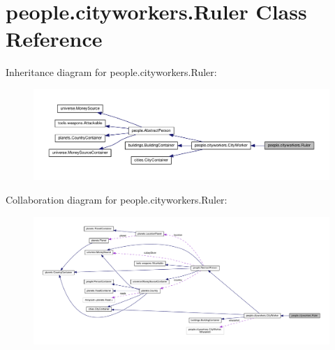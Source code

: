 \hypertarget{classpeople_1_1cityworkers_1_1_ruler}{}\section{people.\+cityworkers.\+Ruler Class Reference}
\label{classpeople_1_1cityworkers_1_1_ruler}


Inheritance diagram for people.\+cityworkers.\+Ruler\+:\nopagebreak
\begin{figure}[H]
\begin{center}
\leavevmode
\includegraphics[width=350pt]{classpeople_1_1cityworkers_1_1_ruler__inherit__graph}
\end{center}
\end{figure}


Collaboration diagram for people.\+cityworkers.\+Ruler\+:\nopagebreak
\begin{figure}[H]
\begin{center}
\leavevmode
\includegraphics[width=350pt]{classpeople_1_1cityworkers_1_1_ruler__coll__graph}
\end{center}
\end{figure}
